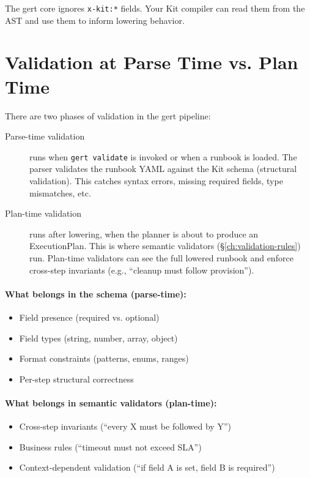 The gert core ignores \texttt{x-kit:*} fields. Your Kit compiler can read them
from the AST and use them to inform lowering behavior.

\section{Validation at Parse Time vs. Plan Time}
\label{sec:parse-vs-plan}

There are two phases of validation in the gert pipeline:

\begin{description}
  \item[Parse-time validation] runs when \texttt{gert validate} is invoked or
    when a runbook is loaded. The parser validates the runbook YAML against
    the Kit schema (structural validation). This catches syntax errors, missing
    required fields, type mismatches, etc.

  \item[Plan-time validation] runs after lowering, when the planner is about to
    produce an ExecutionPlan. This is where semantic validators
    (\S\ref{ch:validation-rules}) run. Plan-time validators can see the full
    lowered runbook and enforce cross-step invariants (e.g., ``cleanup must
    follow provision'').
\end{description}

\paragraph{What belongs in the schema (parse-time):}

\begin{itemize}
  \item Field presence (required vs. optional)
  \item Field types (string, number, array, object)
  \item Format constraints (patterns, enums, ranges)
  \item Per-step structural correctness
\end{itemize}

\paragraph{What belongs in semantic validators (plan-time):}

\begin{itemize}
  \item Cross-step invariants (``every X must be followed by Y'')
  \item Business rules (``timeout must not exceed SLA'')
  \item Context-dependent validation (``if field A is set, field B is required'')
\end{itemize}

